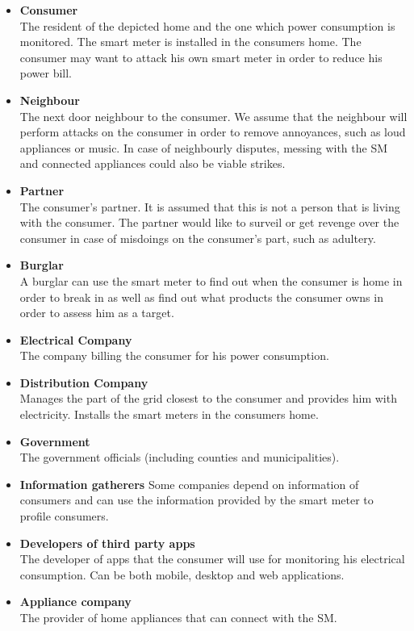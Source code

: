 \begin{itemize}
\item \textbf{Consumer}\\
The resident of the depicted home and the one which power consumption is monitored.
The smart meter is installed in the consumers home.
The consumer may want to attack his own smart meter in order to reduce his power bill.
\item \textbf{Neighbour}\\
The next door neighbour to the consumer.
We assume that the neighbour will perform attacks on the consumer in order to remove annoyances, such as loud appliances or music.
In case of neighbourly disputes, messing with the SM and connected appliances could also be viable strikes.
\item \textbf{Partner}\\
The consumer's partner.
It is assumed that this is not a person that is living with the consumer.
The partner would like to surveil or get revenge over the consumer in case of misdoings on the consumer's part, such as adultery.
\item \textbf{Burglar}\\ A burglar can use the smart meter to find out when the consumer is home in order to break in as well as find out what products the consumer owns in order to assess him as a target.
\item \textbf{Electrical Company}\\
The company billing the consumer for his power consumption.
\item \textbf{Distribution Company}\\
Manages the part of the grid closest to the consumer and provides him with electricity.
Installs the smart meters in the consumers home.
\item \textbf{Government}\\
The government officials (including counties and municipalities).
\item \textbf{Information gatherers} Some companies depend on information of consumers and can use the information provided by the smart meter to profile consumers.
\item \textbf{Developers of third party apps}\\
The developer of apps that the consumer will use for monitoring his electrical consumption. Can be both mobile, desktop and web applications.
\item \textbf{Appliance company}\\ The provider of home appliances that can connect with the SM.

\end{itemize}
